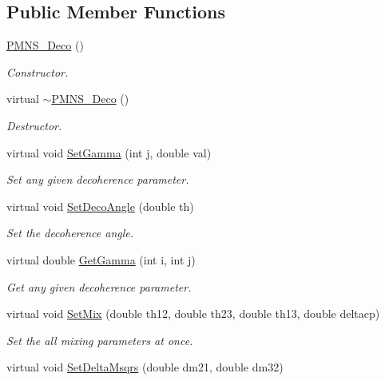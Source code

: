 \subsection*{Public Member Functions}
\begin{DoxyCompactItemize}
\item 
\hyperlink{classOscProb_1_1PMNS__Deco_a976dc43bb65547af5f4a27f5a8fccbba}{P\+M\+N\+S\+\_\+\+Deco} ()
\begin{DoxyCompactList}\small\item\em Constructor. \end{DoxyCompactList}\item 
virtual \hyperlink{classOscProb_1_1PMNS__Deco_a5539610ab44c510c204ae884fb8e2a0e}{$\sim$\+P\+M\+N\+S\+\_\+\+Deco} ()
\begin{DoxyCompactList}\small\item\em Destructor. \end{DoxyCompactList}\item 
virtual void \hyperlink{classOscProb_1_1PMNS__Deco_ac06a9c503d1c5b4a43c4eb797881898d}{Set\+Gamma} (int j, double val)
\begin{DoxyCompactList}\small\item\em Set any given decoherence parameter. \end{DoxyCompactList}\item 
virtual void \hyperlink{classOscProb_1_1PMNS__Deco_a35e79054682aa88c55f4350c29336014}{Set\+Deco\+Angle} (double th)
\begin{DoxyCompactList}\small\item\em Set the decoherence angle. \end{DoxyCompactList}\item 
virtual double \hyperlink{classOscProb_1_1PMNS__Deco_a73461e806063588a8e3a9d5d0dd201cb}{Get\+Gamma} (int i, int j)
\begin{DoxyCompactList}\small\item\em Get any given decoherence parameter. \end{DoxyCompactList}\item 
virtual void \hyperlink{classOscProb_1_1PMNS__Fast_ad849b2231d99c5d66fb3ade8efb896e1}{Set\+Mix} (double th12, double th23, double th13, double deltacp)
\begin{DoxyCompactList}\small\item\em Set the all mixing parameters at once. \end{DoxyCompactList}\item 
virtual void \hyperlink{classOscProb_1_1PMNS__Fast_a63733b246e6d2e609ce3de7a65ba5b9f}{Set\+Delta\+Msqrs} (double dm21, double dm32)

\end{DoxyCompactItemize}
